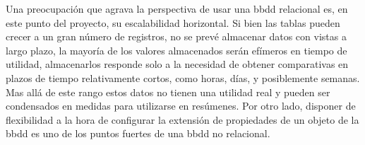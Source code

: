 Una preocupación que agrava la perspectiva de usar una \gls{bbdd} relacional es, en este punto del proyecto, su escalabilidad horizontal. Si bien las tablas pueden crecer a un gran número de registros, no se prevé almacenar datos con vistas a largo plazo, la mayoría de los valores almacenados serán efímeros en tiempo de utilidad, almacenarlos responde solo a la necesidad de obtener comparativas en plazos de tiempo relativamente cortos, como horas, días, y posiblemente semanas. Mas allá de este rango estos datos no tienen una utilidad real y pueden ser condensados en medidas para utilizarse en resúmenes. Por otro lado, disponer de flexibilidad a la hora de configurar la extensión de propiedades de un objeto de la \gls{bbdd} es uno de los puntos fuertes de una \gls{bbdd} no relacional.
